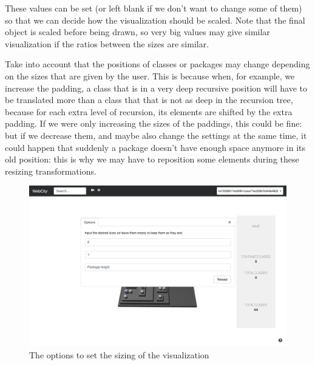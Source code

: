 \documentclass[]{usiinfbachelorproject}
\begin{document}
These values can be set (or left blank if we don't want to change some of them) so that we can decide how the visualization should be scaled. Note that the final object is scaled before being drawn, so very big values may give similar visualization if the ratios between the sizes are similar.

Take into account that the positions of classes or packages may change depending on the sizes that are given by the user. This is because when, for example, we increase the padding, a class that is in a very deep recursive position will have to be translated more than a class that that is not as deep in the recursion tree, because for each extra level of recursion, its elements are shifted by the extra padding. If we were only increasing the sizes of the paddings, this could be fine: but if we decrease them, and maybe also change the settings at the same time, it could happen that suddenly a package doesn't have enough space anymore in its old position: this is why we may have to reposition some elements during these resizing transformations.

\begin{figure} [H]
\centering
\includegraphics[width=1\textwidth]{pictures/sizing_card.png}
\caption{The options to set the sizing of the visualization}
\label{fig:sizing}
\end{figure}
\end{document}
